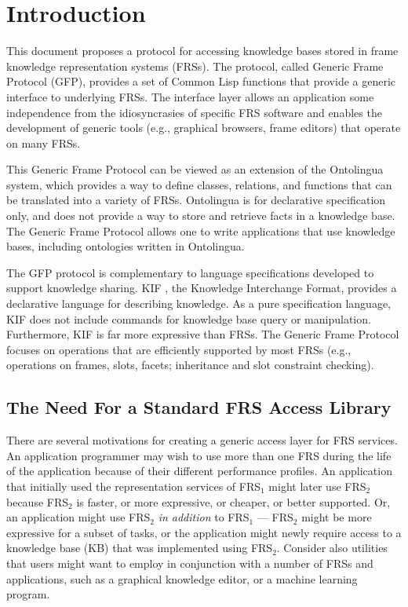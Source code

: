 


\chapter{Introduction}

This document proposes a protocol for accessing knowledge bases stored
in frame knowledge representation systems (FRSs).  The protocol,
called Generic Frame Protocol (GFP), provides a set of Common Lisp functions that
provide a generic interface to underlying FRSs.  The interface layer
allows an application some independence from the idiosyncrasies of
specific FRS software and enables the development of generic tools
(e.g., graphical browsers, frame editors) that operate on many FRSs.

This Generic Frame Protocol can be viewed as an extension of the Ontolingua
system\cite{ontolingua}, which provides a way to define classes, relations,
and functions that can be translated into a variety of FRSs.  Ontolingua is
for declarative specification only, and does not provide a way to store and
retrieve facts in a knowledge base.  The Generic Frame Protocol allows one to
write applications that use knowledge bases, including ontologies written in
Ontolingua.


The GFP protocol is complementary to language specifications developed to
support knowledge sharing.  KIF \cite{kif}, the Knowledge Interchange Format,
provides a declarative language for describing knowledge.  As a pure
specification language, KIF does not include commands for knowledge base query
or manipulation.  Furthermore, KIF is far more expressive than FRSs.  The
Generic Frame Protocol focuses on operations that are efficiently supported by
most FRSs (e.g., operations on frames, slots, facets; inheritance and slot
constraint checking).

\section{The Need For a Standard FRS Access Library}

There are several motivations for creating a generic access layer for
FRS services.  An application programmer may wish to use more than one
FRS during the life of the application because of their different
performance profiles.  An application that initially used the
representation services of FRS$_1$ might later use FRS$_2$ because
FRS$_2$ is faster, or more expressive, or cheaper, or better
supported.  Or, an application might use FRS$_2$ {\em in addition} to
FRS$_1$ --- FRS$_2$ might be more expressive for a subset of tasks, or
the application might newly require access to a knowledge base (KB)
that was implemented using FRS$_2$.  Consider also utilities that
users might want to employ in conjunction with a number of FRSs and
applications, such as a graphical knowledge editor, or a machine
learning program.

